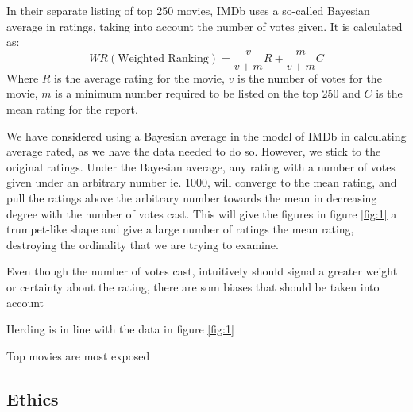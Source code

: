 \documentclass[12pt]{article}
\begin{document}
In their separate listing of top 250 movies, IMDb uses a so-called Bayesian average in ratings, taking into account the number of votes given. It is calculated as:
$$WR (\text{Weighted Ranking})=\frac{v}{v+m}R+\frac{m}{v+m}C$$
Where $R$ is the average rating for the movie, $v$ is the number of votes for the movie, $m$ is a minimum number required to be listed on the top 250 and $C$ is the mean rating for the report. 

We have considered using a Bayesian average in the model of IMDb in calculating average rated, as we have the data needed to do so. However, we stick to the original ratings. Under the Bayesian average, any rating with a number of votes given under an arbitrary number ie. 1000, will converge to the mean rating, and pull the ratings above the arbitrary number towards the mean in decreasing degree with the number of votes cast. This will give the figures in figure \ref{fig:1} a trumpet-like shape and give a large number of ratings the mean rating, destroying the ordinality that we are trying to examine. 

Even though the number of votes cast, intuitively should signal a greater weight or certainty about the rating, there are som biases that should be taken into account

Herding is in line with the data in figure \ref{fig:1}

Top movies are most exposed

\subsection{Ethics}
\end{document}
